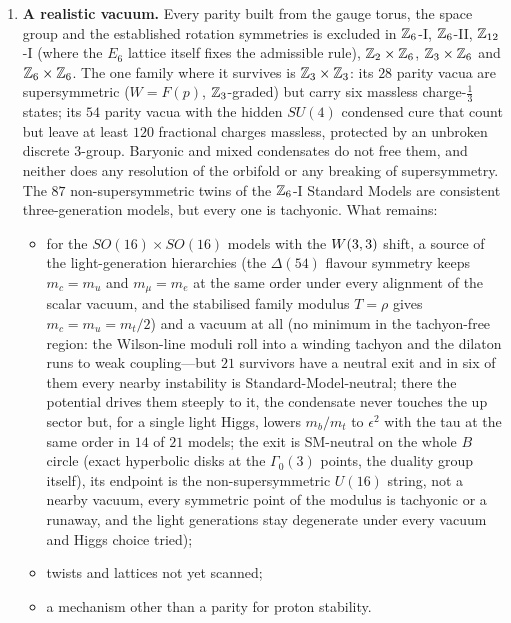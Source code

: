 \begin{enumerate}[label=\textbf{\arabic*.},leftmargin=1.6em,itemsep=5pt]
\item \textbf{A realistic vacuum.} Every parity built from the gauge torus, the space group and the
      established rotation symmetries is excluded in $\mathbb{Z}_6$-I, $\mathbb{Z}_6$-II, $\mathbb{Z}_{12}$-I (where the $E_6$
      lattice itself fixes the admissible rule), $\mathbb{Z}_2\times\mathbb{Z}_6$, $\mathbb{Z}_3\times\mathbb{Z}_6$ and $\mathbb{Z}_6\times\mathbb{Z}_6$.
      The one family where it survives is $\mathbb{Z}_3\times\mathbb{Z}_3$: its $28$ parity vacua are supersymmetric
      ($W=F(p)$, $\mathbb{Z}_3$-graded) but carry six massless charge-$\tfrac13$ states; its $54$ parity vacua
      with the hidden $SU(4)$ condensed cure that count but leave at least $120$ fractional charges
      massless, protected by an unbroken discrete $3$-group. Baryonic and mixed condensates do not free
      them, and neither does any resolution of the orbifold or any breaking of supersymmetry. The $87$
      non-supersymmetric twins of the $\mathbb{Z}_6$-I Standard Models are consistent three-generation models,
      but every one is tachyonic. What remains:
      \begin{itemize}
      \item for the $SO(16)\times SO(16)$ models with the $W(3,3)$ shift, a source of the light-generation
            hierarchies (the $\Delta(54)$ flavour symmetry keeps $m_c=m_u$ and $m_\mu=m_e$ at the same order under
            every alignment of the scalar vacuum, and the stabilised family modulus $T=\rho$ gives $m_c=m_u=m_t/2$) and a
            vacuum at all (no minimum in the tachyon-free region: the Wilson-line moduli roll into a winding
            tachyon and the dilaton runs to weak coupling---but $21$ survivors have a neutral exit and in six of them
            every nearby instability is Standard-Model-neutral; there the potential drives them steeply to it, the
            condensate never touches the up sector but, for a single light Higgs, lowers $m_b/m_t$ to $\epsilon^2$ with
            the tau at the same order in $14$ of $21$ models; the exit is SM-neutral on the whole $B$ circle (exact
            hyperbolic disks at the $\Gamma_0(3)$ points, the duality group itself), its endpoint is the
            non-supersymmetric $U(16)$ string, not a nearby vacuum, every symmetric point of the modulus is tachyonic or a runaway,
            and the light generations stay degenerate under every vacuum and Higgs choice tried);
      \item twists and lattices not yet scanned;
      \item a mechanism other than a parity for proton stability.

\end{itemize}
\end{enumerate}
